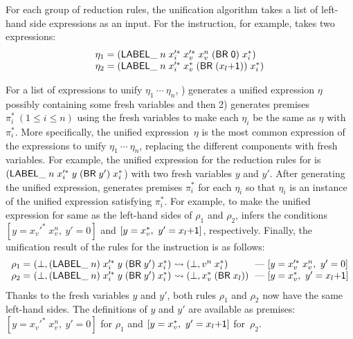 For each group of reduction rules,
the unification algorithm \unify takes a list of left-hand side expressions as an input.
 For the  instruction, for example,
 \unify takes two expressions:
\[
\begin{array}{l}
\eta_1 = (\mathsf{LABEL\_} \; n \; x_i'^*\; x_v'^*\; x_v^{n}\; (\mathsf{BR\; 0})\; x_i^*)\\
\eta_2 = (\mathsf{LABEL\_} \; n \; x_i'^*\; x_v^*\; (\mathsf{BR\; (} x_l\mathsf{+1)})\; x_i^*)
\end{array}
\]

For a list of expressions to unify $\eta_1\ \cdots\ \eta_n$,
) generates a unified expression $\eta$ possibly containing some fresh variables
and then 2) generates premises $\pi_i^*\ (1\le i \le n)$ using the fresh variables to make
each $\eta_i$ be the same as $\eta$ with $\pi_i^*$.
More specifically, the unified expression~$\eta$ is the most common expression of
the expressions to unify $\eta_1\ \cdots\ \eta_n$,
replacing the different components with fresh variables.
For example, the unified expression for the reduction rules for  is
{$(\mathsf{LABEL\_} \; n \; x_i'^*\; y\; (\mathsf{BR}\; y')\; x_i^*$)} with two fresh variables $y$ and $y'$.
After generating the unified expression, \unify generates premises $\pi_i^*$
for each $\eta_i$ so that $\eta_i$ is an instance of the unified expression satisfying $\pi_i^*$.
For example, to make the unified expression for 
same as the left-hand sides of $\rho_1$ and $\rho_2$, \unify infers the conditions
$[y = x_v'^*\; x_v^{n},\ y' = 0]$ and $[y = x_v^*,\ y' = x_l\mathsf{+1}]$, respectively.
Finally, the unification result of the rules for the  instruction is as follows:
\[
\begin{array}{l@{~}l@{~}l@{~}l}
\rho_1 = &(\bot, (\ssf{LABEL\_} \; n) \; x_i'^*\; y\; (\ssf{BR}\; y')\; x_i^*) &\leadsto
 (\bot, v^n\; x_i^*)\ & \mbox{---}\ [y = x_v'^*\; x_v^{n},\ y' = 0]\\
\rho_2 = &(\bot, (\ssf{LABEL\_} \; n) \; x_i'^*\; y\; (\ssf{BR}\; y')\; x_i^*) &\leadsto
 (\bot, x_v^*\; (\ssf{BR}\; x_l))\ & \mbox{---}\ [y = x_v^*,\ y' = x_l\ssf{+1}]
\end{array}
\]
Thanks to the fresh variables $y$ and $y'$, both rules $\rho_1$ and $\rho_2$ now have
the same left-hand sides. The definitions of $y$ and $y'$ are available as premises:
$[y = x_v'^*\; x_v^{n},\ y' = 0]$ for $\rho_1$ and
$[y = x_v^*,\ y' = x_l\mathsf{+1}]$ for~$\rho_2$.


